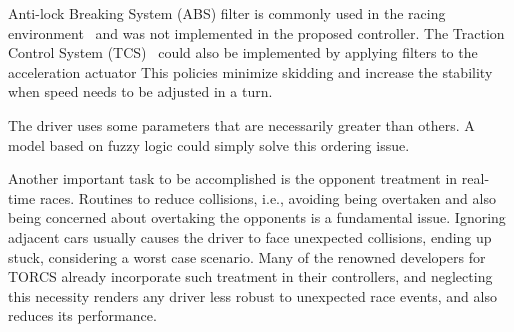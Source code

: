 	Anti-lock Breaking System (ABS) filter is commonly used in the racing environment~\cite{5593318} and was not implemented in the proposed controller. The Traction Control System (TCS)~\cite{5593318} could also be implemented by applying filters to the acceleration actuator This policies minimize skidding and increase the stability when speed needs to be adjusted in a turn.

	The driver uses some parameters that are necessarily greater than others. A model based on fuzzy logic \cite{DIEGO} could simply solve this ordering issue.

	Another important task to be accomplished is the opponent treatment in real-time races. Routines to reduce collisions, i.e., avoiding being overtaken and also being concerned about overtaking the opponents is a fundamental issue. Ignoring adjacent cars usually causes the driver to face unexpected collisions, ending up stuck, considering a worst case scenario. Many of the renowned developers for TORCS already incorporate such treatment in their controllers, and neglecting this necessity renders any driver less robust to unexpected race events, and also reduces its performance.

